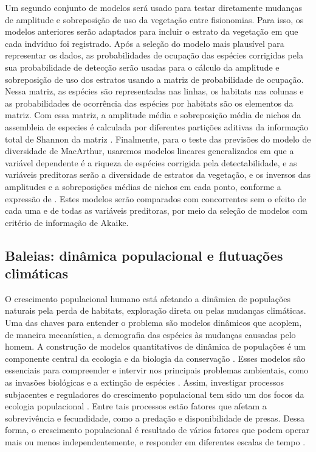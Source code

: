 \documentclass[12pt, A4]{article}
\begin{document}
Um segundo conjunto de modelos será usado para testar diretamente
mudanças de amplitude e sobreposição de uso da vegetação entre
fisionomias. Para isso, os modelos anteriores serão adaptados para
incluir o estrato da vegetação em que cada indvíduo foi registrado.
Após a seleção do modelo mais plausível para representar os dados, as
probabilidades de ocupação das espécies corrigidas pela sua
probabilidade de detecção serão usadas para o cálculo da amplitude e
sobreposição de uso dos estratos usando a matriz de probabilidade de
ocupação. Nessa matriz, as espécies são representadas nas linhas, os
habitats nas colunas e as probabilidades de ocorrência das espécies
por habitats são os elementos da matriz. Com essa matriz, a amplitude
média e sobreposição média de nichos da assembleia de especies é
calculada por diferentes partições aditivas da informação total de
Shannon da matriz \citep{Pielou1972}. Finalmente, para o teste 
das previsões do modelo de diversidade de
MacArthur, usaremos modelos lineares generalizados em que a variável
dependente é a riqueza de espécies corrigida pela detectabilidade, e
as variáveis preditoras serão a diversidade de estratos da vegetação,
e os inversos das amplitudes e a sobreposições médias de nichos em
cada ponto, conforme a expressão de \citet{MacArthur1972}.  Estes modelos
serão comparados com concorrentes sem o efeito de cada uma e de
todas as variáveis preditoras, por meio da seleção de modelos com
critério de informação de Akaike. 

\subsection{Baleias: dinâmica populacional e flutuações climáticas}
\label{sec:dinam-popul-de}

O crescimento populacional humano está afetando a dinâmica de
populações naturais pela perda de habitats, exploração direta ou pelas
mudanças climáticas. Uma das chaves para entender o problema são
modelos dinâmicos que acoplem, de maneira mecanística, a demografia
das espécies às mudanças causadas pelo homem. A construção de modelos
quantitativos de dinâmica de populações é um componente central da
ecologia e da biologia da conservação \citep{sutherland2008}. 
Esses modelos são essenciais para compreender e intervir nos
principais problemas ambientais, como as invasões biológicas
\citep{gurevitch2011} e a extinção de espécies \citep{morris2002}. 
Assim, investigar processos subjacentes e reguladores do
crescimento populacional tem sido um dos focos da ecologia
populacional \citep{rockwood2006}. Entre tais processos
estão fatores que afetam a sobrevivência e fecundidade, como a
predação e disponibilidade de presas. Dessa forma, o crescimento
populacional é resultado de vários fatores que podem operar mais ou
menos independentemente, e responder em diferentes escalas 
de tempo \citep{croxall1992}.
\end{document}
